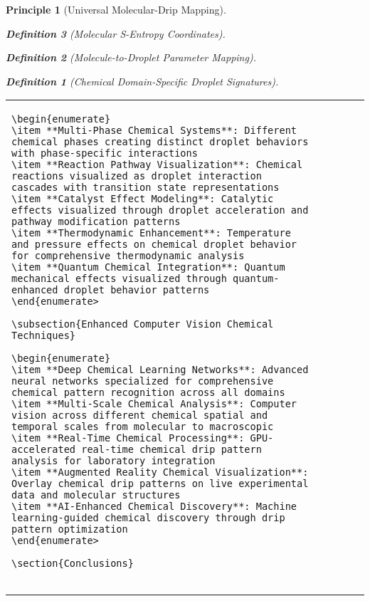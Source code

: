 \documentclass[12pt,a4paper]{article}
\newtheorem{definition}{Definition}
\newtheorem{principle}{Principle}
\begin{document}
\begin{principle}[Universal Molecular-Drip Mapping]
\begin{definition}[Molecular S-Entropy Coordinates]
\begin{definition}[Molecule-to-Droplet Parameter Mapping]
\begin{algorithm}
\begin{algorithmic}[1]
\begin{definition}[Chemical Domain-Specific Droplet Signatures]
\begin{table}[H]
\begin{tabular}{lcccc}
\begin{lstlisting}[style=pythonstyle, caption=Computer Vision Comprehensive Chemical Pattern Analysis]
\begin{enumerate}
\item **Multi-Phase Chemical Systems**: Different chemical phases creating distinct droplet behaviors with phase-specific interactions
\item **Reaction Pathway Visualization**: Chemical reactions visualized as droplet interaction cascades with transition state representations
\item **Catalyst Effect Modeling**: Catalytic effects visualized through droplet acceleration and pathway modification patterns
\item **Thermodynamic Enhancement**: Temperature and pressure effects on chemical droplet behavior for comprehensive thermodynamic analysis
\item **Quantum Chemical Integration**: Quantum mechanical effects visualized through quantum-enhanced droplet behavior patterns
\end{enumerate>

\subsection{Enhanced Computer Vision Chemical Techniques}

\begin{enumerate}
\item **Deep Chemical Learning Networks**: Advanced neural networks specialized for comprehensive chemical pattern recognition across all domains
\item **Multi-Scale Chemical Analysis**: Computer vision across different chemical spatial and temporal scales from molecular to macroscopic
\item **Real-Time Chemical Processing**: GPU-accelerated real-time chemical drip pattern analysis for laboratory integration
\item **Augmented Reality Chemical Visualization**: Overlay chemical drip patterns on live experimental data and molecular structures
\item **AI-Enhanced Chemical Discovery**: Machine learning-guided chemical discovery through drip pattern optimization
\end{enumerate>

\section{Conclusions}


\end{lstlisting}
\end{tabular}
\end{table}
\end{definition}
\end{algorithmic}
\end{algorithm}
\end{definition}
\end{definition}
\end{principle}
\end{document}

